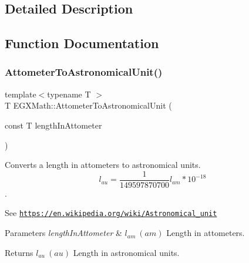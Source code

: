 \subsection{Detailed Description}


\subsection{Function Documentation}
\mbox{\label{group___e_g_x_math-_conversions-_length_conversions-_attometer-_astronomical_ga194198d78186434768016c930eae1933}} 
\subsubsection{\texorpdfstring{Attometer\+To\+Astronomical\+Unit()}{AttometerToAstronomicalUnit()}}
{\footnotesize\ttfamily template$<$typename T $>$ \\
T E\+G\+X\+Math\+::\+Attometer\+To\+Astronomical\+Unit (\begin{DoxyParamCaption}\item[{const T}]{length\+In\+Attometer }\end{DoxyParamCaption})}



Converts a length in attometers to astronomical units. \[ l_{au}= \frac{1}{149597870700} l_{am} * 10^{-18}\]. 

See \href{https://en.wikipedia.org/wiki/Astronomical_unit}{\tt https\+://en.\+wikipedia.\+org/wiki/\+Astronomical\+\_\+unit} 
\begin{DoxyParams}{Parameters}
{\em length\+In\+Attometer} & $ l_{am}\ (am)$ Length in attometers. \\
\hline
\end{DoxyParams}
\begin{DoxyReturn}{Returns}
$ l_{au}\ (au)$ Length in astronomical units. 
\end{DoxyReturn}
\mbox{\label{group___e_g_x_math-_conversions-_length_conversions-_attometer-_astronomical_gaca916475a6757e4eb793a7f09bbf46b1}} 
